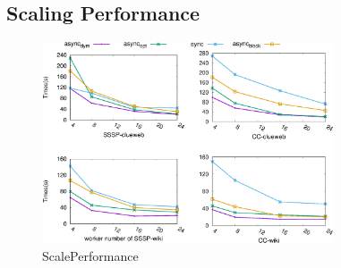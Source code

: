  \subsection{Scaling Performance}
 \label{sec:expr:scale}

\begin{figure}[!t]
	\vspace{0.0in}
	\centering
	\includegraphics[width=3.4in]{figuration/scale.eps}
	\vspace{-0.1in}
	\caption{ScalePerformance}
	\label{fig:scale}
	\vspace{-0.1in}
\end{figure}


